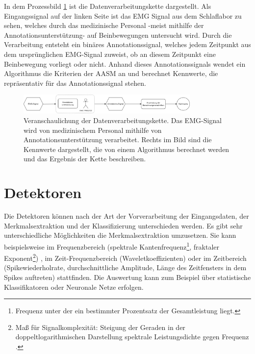 In dem Prozessbild \ref{fig:Prozessbild} ist die Datenverarbeitungskette dargestellt. Als Eingangssignal auf der linken Seite ist das EMG Signal aus dem Schlaflabor zu sehen, welches durch das medizinische Personal -meist mithilfe der Annotationsunterstützung- auf Beinbewegungen untersucht wird. Durch die Verarbeitung entsteht ein binäres Annotationssignal, welches jedem Zeitpunkt aus dem ursprünglichen EMG-Signal zuweist, ob an diesem Zeitpunkt eine Beinbewegung vorliegt oder nicht. Anhand dieses Annotationssignals wendet ein Algorithmus die Kriterien der AASM an und berechnet Kennwerte, die repräsentativ für das Annotationssignal stehen.


\begin{figure}[!ht]%
	\begin{center}
	\includegraphics[width=0.80\textwidth]{./Bilder/Prozessbildrot.drawio.png}
	\end{center}
	\caption{Veranschaulichung der Datenverarbeitungskette. Das EMG-Signal wird von medizinischem Personal mithilfe von Annotationsunterstützung verarbeitet. Rechts im Bild sind die Kennwerte dargestellt, die von einem Algorithmus berechnet werden und das Ergebnis der Kette beschreiben.}%
	\label{fig:Prozessbild}%
\end{figure}

\section{Detektoren}
Die Detektoren können nach der Art der Vorverarbeitung der Eingangsdaten, der Merkmalsextraktion und der Klassifizierung unterschieden werden. Es gibt sehr unterschiedliche Möglichkeiten die Merkmalsextraktion umzusetzen. Sie kann beispielsweise im Frequenzbereich (spektrale Kantenfrequenz\footnote{Frequenz unter der ein bestimmter Prozentsatz der Gesamtleistung liegt.}, fraktaler Exponent\footnote{Maß für Signalkomplexität: Steigung der Geraden in der doppeltlogarithmischen Darstellung spektrale Leistungsdichte gegen Frequenz \cite{dirichlet}.}) \cite{dirichlet}, im Zeit-Frequenzbereich (Waveletkoeffizienten) \cite{shroko} oder im Zeitbereich (Spikewiederholrate, durchschnittliche Amplitude, Länge des Zeitfensters in dem Spikes auftreten) \cite{wetter} stattfinden. Die Auswertung kann zum Beispiel über statistische Klassifikatoren \cite{probabilistic,dirichlet} oder Neuronale Netze \cite{Carvelli,shroko} erfolgen.

